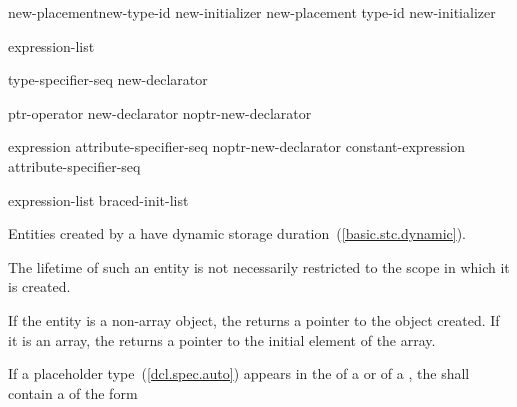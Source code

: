 \begin{bnf}
\br
    \terminal{::}\opt{}  new-placement\opt new-type-id new-initializer\opt \br
    \terminal{::}\opt{}  new-placement\opt{} \terminal{(} type-id \terminal{)} new-initializer\opt
\end{bnf}

%
%
\begin{bnf}
\br
    \terminal{(} expression-list \terminal{)}
\end{bnf}

\begin{bnf}
\br
    type-specifier-seq new-declarator\opt
\end{bnf}

\begin{bnf}
\br
    ptr-operator new-declarator\opt \br
    noptr-new-declarator
\end{bnf}

\begin{bnf}
\br
    \terminal{[} expression \terminal{]} attribute-specifier-seq\opt\br
    noptr-new-declarator \terminal{[} constant-expression \terminal{]} attribute-specifier-seq\opt
\end{bnf}

\begin{bnf}
\br
    \terminal{(} expression-list\opt{} \terminal{)}\br
    braced-init-list
\end{bnf}

%
Entities created by a  have dynamic storage
duration~(\ref{basic.stc.dynamic}).
\begin{note}
%
The lifetime of such an entity is not necessarily restricted to the
scope in which it is created.
\end{note}
If the entity is a non-array object, the 
returns a pointer to the object created. If it is an array, the
 returns a pointer to the initial element of
the array.

\pnum
If a placeholder type~(\ref{dcl.spec.auto}) appears in the
 of a  or
 of a ,
the  shall contain a
 of the form

